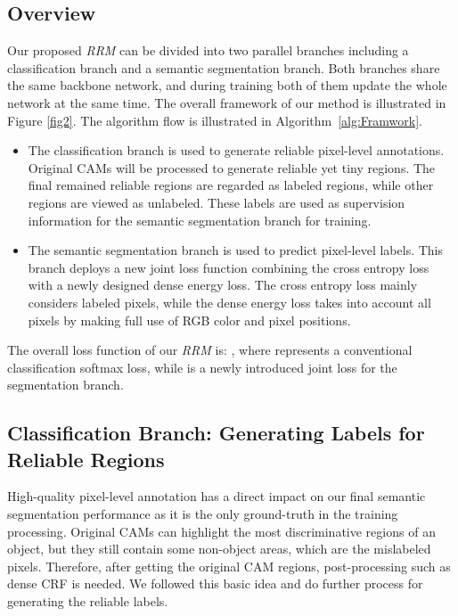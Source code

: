 \documentclass[letterpaper]{article} \usepackage{aaai20}  \usepackage{times}  \usepackage{helvet} \usepackage{courier}  \usepackage[hyphens]{url}  \usepackage{graphicx} \urlstyle{rm} \def\UrlFont{\rm}  \usepackage{graphicx}  \frenchspacing  \setlength{\pdfpagewidth}{8.5in}  \setlength{\pdfpageheight}{11in}
\begin{document}
\subsection{Overview}
Our proposed \emph{RRM} can be divided into two parallel branches including a classification branch and a semantic segmentation branch. Both branches share the same backbone network, and during training both of them update the whole network at the same time. The overall framework of our method is illustrated in Figure \ref{fig2}. The  algorithm flow is illustrated in Algorithm~\ref{alg:Framwork}.
\begin{itemize}
	\item The classification branch is used to generate reliable pixel-level annotations. Original CAMs will be processed to generate reliable yet tiny regions. The final remained reliable regions are regarded as labeled regions, while other regions are viewed as unlabeled. These labels are used as supervision information for the semantic segmentation branch for training. 
	\item The semantic segmentation branch is used to predict pixel-level labels. This branch deploys a new joint loss function combining the cross entropy loss with a newly designed dense energy loss. The cross entropy loss mainly considers labeled pixels, while the dense energy loss takes into account all pixels by making full use of RGB color and pixel positions. 
\end{itemize}

The overall loss function of our \emph{RRM} is: , where  represents a conventional classification softmax loss, while  is a newly introduced joint loss for the segmentation branch.  

\subsection{Classification Branch: Generating Labels for Reliable Regions}\label{sec3.2}

High-quality pixel-level annotation has a direct impact on our final semantic segmentation performance as it is the only ground-truth in the training processing. Original CAMs can highlight the most discriminative regions of an object, but they still contain some non-object areas, which are the mislabeled pixels. Therefore, after getting the original CAM regions, post-processing such as dense CRF \cite{krahenbuhl2013parameter} is needed. We followed this basic idea and do further process for generating the reliable labels.
\end{document}

